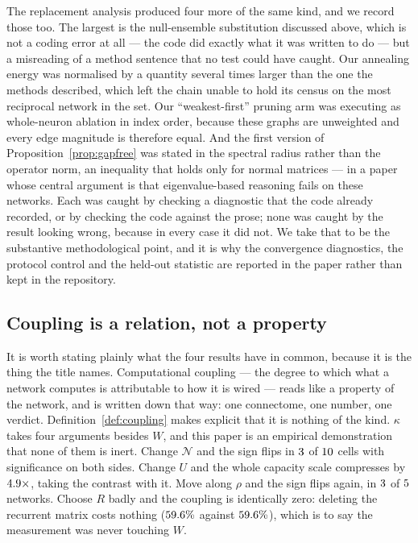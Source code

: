 The replacement analysis produced four more of the same kind, and we record those too.
The largest is the null-ensemble substitution discussed above, which is not a coding
error at all --- the code did exactly what it was written to do --- but a
misreading of a method sentence that no test could have caught.
Our annealing energy was normalised by a quantity several times larger than the one the
methods described, which left the chain unable to hold its census on the most reciprocal
network in the set. Our ``weakest-first'' pruning arm was executing as whole-neuron
ablation in index order, because these graphs are unweighted and every edge magnitude is
therefore equal. And the first version of Proposition~\ref{prop:gapfree} was stated in
the spectral radius rather than the operator norm, an inequality that holds only for
normal matrices --- in a paper whose central argument is that eigenvalue-based reasoning
fails on these networks. Each was caught by checking a diagnostic that the code already
recorded, or by checking the code against the prose; none was caught by the result
looking wrong, because in every case it did not. We take that to be the substantive
methodological point, and it is why the convergence diagnostics, the protocol control
and the held-out statistic are reported in the paper rather than kept in the
repository.

\subsection{Coupling is a relation, not a property}
\label{sec:disc-coupling}

It is worth stating plainly what the four results have in common, because it is the
thing the title names. Computational coupling --- the degree to which what a network
computes is attributable to how it is wired --- reads like a property of the network, and
is written down that way: one connectome, one number, one verdict. Definition~\ref{def:coupling}
makes explicit that it is nothing of the kind. $\kappa$ takes four arguments besides $W$,
and this paper is an empirical demonstration that none of them is inert. Change
$\mathcal{N}$ and the sign flips in $3$ of $10$ cells with
significance on both sides. Change $U$ and the whole capacity scale compresses by
$4.9\times$, taking the contrast with it. Move along $\rho$ and the sign flips
again, in $3$ of $5$ networks. Choose $R$ badly and the coupling
is identically zero: deleting the recurrent matrix costs nothing
($59.6\%$ against $59.6\%$), which is to say the measurement was never
touching $W$.

